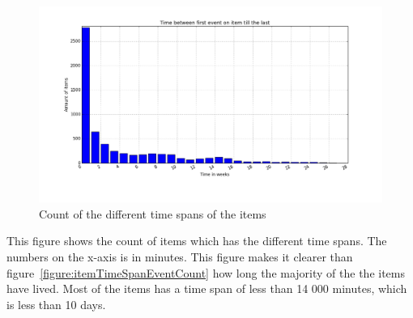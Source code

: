     \begin{figure}[H]
        \includegraphics[width=5in]{image/itemTimespansdistribution.png}
        \centering
        \caption{Count of the different time spans of the items}
    \label{figure:itemLifes}
    \end{figure}
        This figure shows the count of items which has the different time spans.
        The numbers on the x-axis is in minutes.
        This figure makes it clearer than figure~\ref{figure:itemTimeSpanEventCount} how long the majority of the the items have lived.
        Most of the items has a time span of less than 14 000 minutes, which is less than 10 days.

